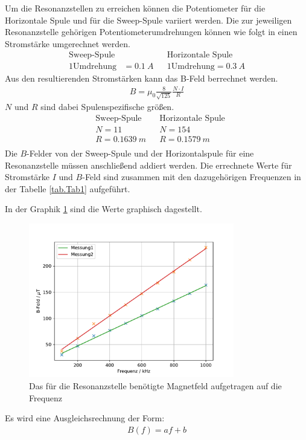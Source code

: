Um die Resonanzstellen zu erreichen können die Potentiometer für die Horizontale Spule und für die Sweep-Spule variiert werden.
Die zur jeweiligen Resonanzstelle gehörigen Potentiometerumdrehungen können wie folgt in einen Stromstärke umgerechnet werden.
\begin{align*}
  \text{Sweep-Spule}&&&\text{Horizontale Spule}\\
  1 \text{Umdrehung} &= \SI{0,1}{A}&&1 \text{Umdrehung} = \SI{0,3}{A}
\end{align*}
Aus den resultierenden Stromstärken kann das B-Feld berrechnet werden.
\begin{align*}
  B=\mu_0\frac{8}{\sqrt{125}}\frac{N\cdot I}{R}
\end{align*}
$N$ und $R$ sind dabei Spulenspezifische größen.
\begin{align*}
  &\text{Sweep-Spule}&&\text{Horizontale Spule}\\
  &N=11&&N=154\\
  &R=\SI{0.1639}{m}&&R=\SI{0.1579}{m}\\
\end{align*}
Die $B$-Felder von der Sweep-Spule und der Horizontalspule für eine Resonanzstelle müssen anschließend addiert werden.
Die errechnete Werte für Stromstärke $I$ und $B$-Feld sind zusammen mit den dazugehörigen Frequenzen in der Tabelle \ref{tab.Tab1} aufgeführt.

In der Graphik \ref{fig:Bf} sind die Werte graphisch dagestellt.
\begin{figure}[h!]
  \centering
  \includegraphics[width=0.8\textwidth]{B-Feld.pdf}
  \caption{Das für die Resonanzstelle benötigte Magnetfeld aufgetragen auf die Frequenz}
  \label{fig:Bf}
\end{figure}
Es wird eine Ausgleichsrechnung der Form:
\begin{align*}
  B(f)=af+b
\end{align*}
